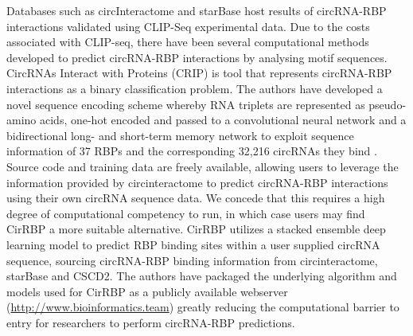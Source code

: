 \documentclass[journal,review,submit,pdftex,moreauthors]{Definitions/mdpi}
\begin{document}
Databases such as circInteractome \cite{circinteractome} and starBase \cite{starbase} host results of circRNA-RBP interactions validated using CLIP-Seq experimental data. Due to the costs associated with CLIP-seq, there have been several computational methods developed to predict circRNA-RBP interactions by analysing motif sequences. CircRNAs Interact with Proteins (CRIP) is tool that represents circRNA-RBP interactions as a binary classification problem. The authors have developed a novel sequence encoding scheme whereby RNA triplets are represented as pseudo-amino acids, one-hot encoded and passed to a convolutional neural network and a bidirectional long- and short-term memory network to exploit sequence information of 37 RBPs and the corresponding 32,216 circRNAs they bind \cite{CRIP}. Source code and training data are freely available, allowing users to leverage the information provided by circinteractome to predict circRNA-RBP interactions using their own circRNA sequence data. We concede that this requires a high degree of computational competency to run, in which case users may find CirRBP \cite{CirRBP} a more suitable alternative. CirRBP utilizes a stacked ensemble deep learning model to predict RBP binding sites within a user supplied circRNA sequence, sourcing circRNA-RBP binding information from circinteractome, starBase and CSCD2. The authors have packaged the underlying algorithm and models used for CirRBP as a publicly available webserver (\href{http://www.bioinformatics.team}{http://www.bioinformatics.team}) greatly reducing the computational barrier to entry for researchers to perform circRNA-RBP predictions. 
\end{document}
